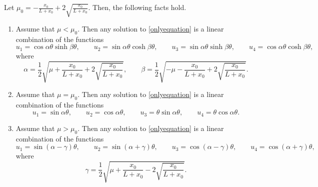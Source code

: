 \documentclass[10pt,a4paper]{amsart}
\begin{document}
\begin{proposition}\label{soluzgenrralestab}
Let $\mu_0=-\frac{x_0}{L+x_0}+2\sqrt{\frac{x_0}{L+x_0}}$. Then, the following facts hold.
\begin{enumerate}
	\item [(i)] Assume that $\mu<\mu_0$.
	Then any solution to \eqref{onlyequation} is a linear combination of the functions    \begin{equation}\label{soluzionicasocomplesso}
		u_1=\cos \alpha\theta\sinh\beta\theta,\qquad
		u_2=\sin \alpha\theta\cosh\beta\theta,\qquad
		u_3= \sin \alpha\theta\sinh\beta\theta,\qquad
		u_4=\cos \alpha\theta\cosh\beta\theta,
	\end{equation}
	where
	\begin{equation}\label{alfabetacomplesso}
		\alpha=\frac{1}{2}\sqrt{\mu+\frac{x_0}{L+x_0}+2\sqrt{\frac{x_0}{L+x_0}}},\qquad\beta=\frac{1}{2}\sqrt{-\mu-\frac{x_0}{L+x_0}+2\sqrt{\frac{x_0}{L+x_0}}}.
	\end{equation}
	\item [(ii)] Assume that $\mu=\mu_0$.
	Then any solution to \eqref{onlyequation} is a linear combination of the functions     \begin{equation}\label{soluzionicasocritico}
		u_1=\sin\alpha \theta,\qquad
		u_2=\cos \alpha\theta,\qquad
		u_3= \theta\sin \alpha\theta,\qquad
		u_4=\theta\cos \alpha\theta.
	\end{equation}
	\item [(iii)] Assume that $\mu>\mu_0$.
Then any solution to \eqref{onlyequation} is a linear combination of the functions
\begin{equation}\label{soluzionicasoreale}
	u_1=\sin\left(\alpha-\gamma\right) \theta,\qquad
	u_2=\sin \left(\alpha+\gamma\right)\theta,\qquad
	u_3= \cos (\alpha-\gamma)\theta,\qquad
	u_4=\cos (\alpha+\gamma)\theta,
\end{equation}
where
\begin{equation}\label{defigamma}
	\gamma=\frac{1}{2}\sqrt{\mu+\frac{x_0}{L+x_0}-2\sqrt{\frac{x_0}{L+x_0}}}.
\end{equation}
\end{enumerate}
\end{proposition}
\end{document}
